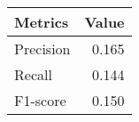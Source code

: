 \begin{tabular}{lr}
\toprule
Metrics & Value \\
\midrule
Precision & 0.165 \\
Recall & 0.144 \\
F1-score & 0.150 \\
\bottomrule
\end{tabular}
